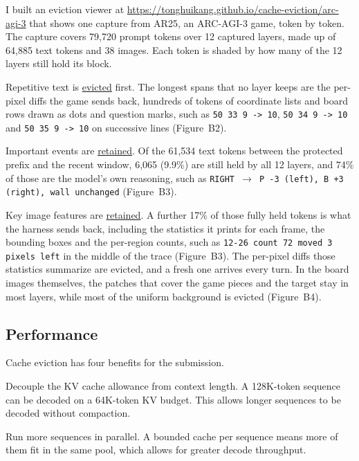 \documentclass[10pt,letterpaper]{article}
\newcommand{\term}[1]{{\fontseries{b}\selectfont #1}}
\begin{document}
I built an eviction viewer at \url{https://tonghuikang.github.io/cache-eviction/arc-agi-3} that shows one capture from AR25, an ARC-AGI-3 game, token by token.
The capture covers 79,720 prompt tokens over 12 captured layers, made up of 64,885 text tokens and 38 images.
Each token is shaded by how many of the 12 layers still hold its block.

\term{Repetitive text is \href{https://tonghuikang.github.io/cache-eviction/arc-agi-3/?focus=retained&pos=44940}{evicted} first.}
The longest spans that no layer keeps are the per-pixel diffs the game sends back, hundreds of tokens of coordinate lists and board rows drawn as dots and question marks, such as \texttt{50 33 9 -> 10}, \texttt{50 34 9 -> 10} and \texttt{50 35 9 -> 10} on successive lines (Figure~B2).

\term{Important events are \href{https://tonghuikang.github.io/cache-eviction/arc-agi-3/?focus=retained&pos=47078}{retained}.}
Of the 61,534 text tokens between the protected prefix and the recent window, 6,065 (9.9\%) are still held by all 12 layers, and 74\% of those are the model's own reasoning, such as \texttt{RIGHT \(\rightarrow\) P -3 (left), B +3 (right), wall unchanged} (Figure~B3).

\term{Key image features are \href{https://tonghuikang.github.io/cache-eviction/arc-agi-3/?focus=retained&pos=1631}{retained}.}
A further 17\% of those fully held tokens is what the harness sends back, including the statistics it prints for each frame, the bounding boxes and the per-region counts, such as \texttt{12-26 count 72 moved 3 pixels left} in the middle of the trace (Figure~B3).
The per-pixel diffs those statistics summarize are evicted, and a fresh one arrives every turn.
In the board images themselves, the patches that cover the game pieces and the target stay in most layers, while most of the uniform background is evicted (Figure~B4).

\subsection{Performance}

Cache eviction has four benefits for the submission.

\term{Decouple the KV cache allowance from context length.} A 128K-token sequence can be decoded on a 64K-token KV budget.
This allows longer sequences to be decoded without compaction.

\term{Run more sequences in parallel.} A bounded cache per sequence means more of them fit in the same pool, which allows for greater decode throughput.
\end{document}
